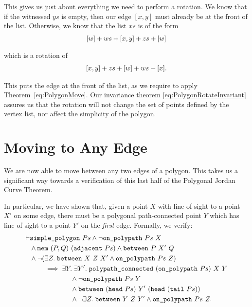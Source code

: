 This gives us just about everything we need to perform a rotation. We know that if the witnessed $ys$ is empty, then our edge $[x,y]$ must already be at the front of the list. Otherwise, we know that the list $xs$ is of the form
\begin{displaymath}
  [w] + ws + [x,y] + zs + [w]
\end{displaymath}

which is a rotation of
\begin{displaymath}
  [x,y] + zs + [w] + ws + [x].
\end{displaymath}

This puts the edge at the front of the list, as we require to apply Theorem~\ref{eq:PolygonMove}. Our invariance theorem \eqref{eq:PolygonRotateInvariant} assures us that the rotation will not change the set of points defined by the vertex list, nor affect the simplicity of the polygon.

\section{Moving to Any Edge}
We are now able to move between any two edges of a polygon. This takes us a significant way towards a verification of this last half of the Polygonal Jordan Curve Theorem. 

In particular, we have shown that, given a point $X$ with line-of-sight to a point $X'$ on some edge, there must be a polygonal path-connected point $Y$ which has line-of-sight to a point $Y'$ on the \emph{first} edge. Formally, we verify:
\begin{equation*}
  \begin{split}
\vdash    &\texttt{simple\_polygon}\ Ps \wedge \neg\texttt{on\_polypath}\ Ps\ X\\
    &\wedge \texttt{mem}\ (P,Q)\ (\texttt{adjacent}\ Ps) \wedge \texttt{between}\ P\ X'\ Q\\
    &\wedge\neg(\exists Z.\; \texttt{between}\ X\ Z\ X' \wedge \texttt{on\_polypath}\ Ps\ Z)\\
    &\qquad\implies \exists Y.\;\exists Y'.\; \texttt{polypath\_connected}\ (\texttt{on\_polypath}\ Ps)\ X\ Y\\
    &\qquad\qquad\qquad\wedge\neg\texttt{on\_polypath}\ Ps\ Y\\
    &\qquad\qquad\qquad\wedge \texttt{between}\ (\texttt{head}\ Ps)\ Y'\ (\texttt{head}\ (\texttt{tail}\ Ps))\\
    &\qquad\qquad\qquad\wedge \neg\exists Z.\; \texttt{between}\ Y\ Z\ Y' \wedge \texttt{on\_polypath}\ Ps\ Z.
  \end{split}
\end{equation*}

